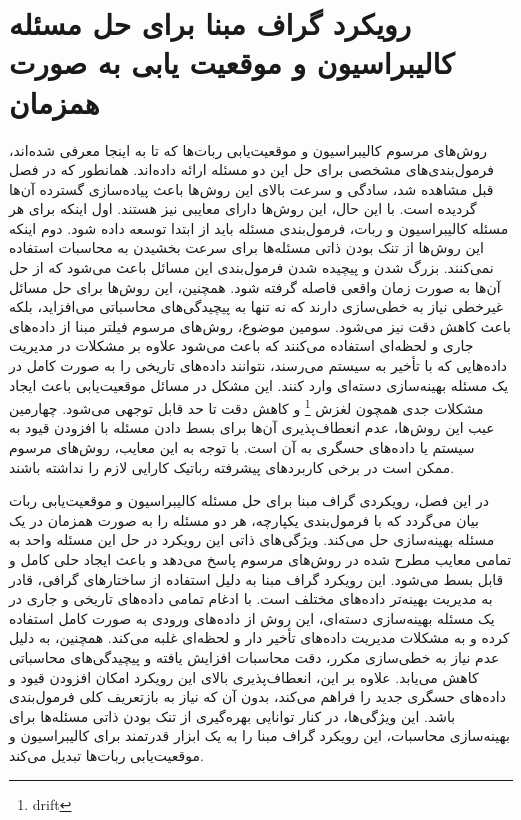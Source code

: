 \section{رویکرد گراف مبنا برای حل مسئله کالیبراسیون و موقعیت یابی به صورت همزمان}
روش‌های مرسوم کالیبراسیون و موقعیت‌یابی ربات‌ها که تا به اینجا معرفی شده‌اند، فرمول‌بندی‌های مشخصی برای حل این دو مسئله ارائه داده‌اند. همانطور که در فصل قبل مشاهده شد، سادگی و سرعت بالای این روش‌ها باعث پیاده‌سازی گسترده آن‌ها گردیده است. با این حال، این روش‌ها دارای معایبی نیز هستند. 
اول اینکه برای هر مسئله کالیبراسیون و ربات، فرمول‌بندی مسئله باید از ابتدا توسعه داده شود. دوم اینکه  این روش‌ها از تنک بودن ذاتی مسئله‌ها برای سرعت بخشیدن به محاسبات استفاده نمی‌کنند.  بزرگ شدن و پیچیده شدن فرمول‌بندی این مسائل باعث می‌شود که از حل آن‌ها به صورت زمان واقعی فاصله گرفته شود.  همچنین، این روش‌ها برای حل مسائل غیرخطی نیاز به خطی‌سازی دارند که نه تنها به پیچیدگی‌های محاسباتی می‌افزاید، بلکه باعث کاهش دقت نیز می‌شود. 
سومین موضوع،  روش‌های مرسوم فیلتر مبنا از داده‌های جاری و لحظه‌ای استفاده می‌کنند که باعث می‌شود علاوه بر مشکلات در مدیریت داده‌هایی که با تأخیر به سیستم می‌رسند، نتوانند داده‌های تاریخی را به صورت کامل در یک مسئله بهینه‌سازی دسته‌ای وارد کنند. این مشکل در مسائل موقعیت‌یابی باعث ایجاد مشکلات جدی همچون لغزش
\footnote{drift}
و کاهش دقت تا حد قابل توجهی می‌شود. چهارمین عیب این روش‌ها، عدم انعطاف‌پذیری آن‌ها برای بسط دادن مسئله با افزودن قیود به سیستم یا داده‌های حسگری به آن است. با توجه به این معایب، روش‌های مرسوم ممکن است در برخی کاربردهای پیشرفته رباتیک کارایی لازم را نداشته باشند. 

در این فصل، رویکردی گراف مبنا برای حل مسئله کالیبراسیون و موقعیت‌یابی ربات بیان می‌گردد که با فرمول‌بندی یکپارچه، هر دو مسئله را به صورت همزمان در یک مسئله بهینه‌سازی حل می‌کند. ویژگی‌های ذاتی این رویکرد در حل این مسئله واحد به تمامی معایب مطرح شده در روش‌های مرسوم پاسخ می‌دهد و باعث ایجاد حلی کامل و قابل بسط می‌شود. این رویکرد گراف مبنا به دلیل استفاده از ساختارهای گرافی، قادر به مدیریت بهینه‌تر داده‌های مختلف است. با ادغام تمامی داده‌های تاریخی و جاری در یک مسئله بهینه‌سازی دسته‌ای، این روش از داده‌های ورودی به صورت کامل استفاده کرده و به مشکلات مدیریت داده‌های تأخیر دار و لحظه‌ای غلبه می‌کند. همچنین، به دلیل عدم نیاز به خطی‌سازی مکرر، دقت محاسبات افزایش یافته و پیچیدگی‌های محاسباتی کاهش می‌یابد. علاوه بر این، انعطاف‌پذیری بالای این رویکرد امکان افزودن قیود و داده‌های حسگری جدید را فراهم می‌کند، بدون آن که نیاز به بازتعریف کلی فرمول‌بندی باشد. این ویژگی‌ها، در کنار توانایی بهره‌گیری از تنک بودن ذاتی مسئله‌ها برای بهینه‌سازی محاسبات، این رویکرد گراف مبنا را به یک ابزار قدرتمند برای کالیبراسیون و موقعیت‌یابی ربات‌ها تبدیل می‌کند.

